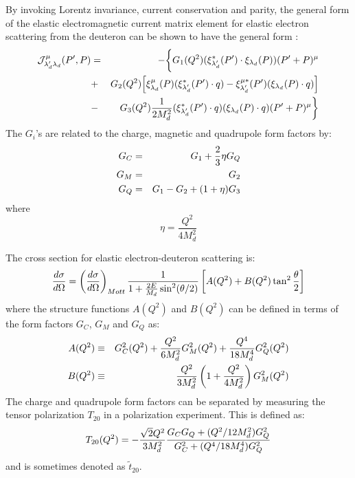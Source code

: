 \documentclass[mythesis.tex]{subfiles}
\begin{document}
By invoking Lorentz invariance, current conservation and parity, the
general form of the elastic electromagnetic current matrix element for
elastic electron scattering from the deuteron can be shown to have the
general form \cite{ACG}:
%
\begin{eqnarray}
{\cal J}^\mu_{\lambda_d' \lambda_d} (P',P) & = & - \biggl \{ G_1 (Q^2)
(\xi^*_{\lambda_d'}(P') \cdot \xi_{\lambda_d}(P) )
(P' + P)^\mu \nonumber \\
& + & G_2 (Q^2) \Bigl [ \xi^\mu_{\lambda_d}(P)
(\xi^*_{\lambda_d'}(P') \cdot q ) -
\xi^{\mu *}_{\lambda_d'}(P') (\xi_{\lambda_d}(P) \cdot q)
\Bigr ] \nonumber \\
& - & G_3 (Q^2) {1 \over 2 M_d^2} (\xi^*_{\lambda_d'}(P')
\cdot q ) ( \xi_{\lambda_d}(P) \cdot q) (P' + P) ^\mu
\biggr \}
\end{eqnarray}
%
The $G_i$'s are related to the charge, magnetic and quadrupole form factors
by:
%
\begin{eqnarray}
G_C & = & G_1 + {2 \over 3} \eta G_Q \nonumber\\
G_M & = & G_2  \nonumber\\
G_Q & = & G_1 - G_2 + (1 + \eta) G_3
\end{eqnarray}
%
where
%
\begin{equation}
\eta=\frac{Q^2}{4 M_d^2}
\end{equation}

The cross section for elastic electron-deuteron scattering is:
\begin{equation}
{d \sigma \over d \Omega} = \left( {d \sigma \over d \Omega}
\right)_{Mott}\frac{1}{ 1 + \frac{2 E }{ M_d} \sin^2
(\theta / 2)  } \left [ A (Q^2) + B (Q^2) \tan^2 {\theta \over 2}
\right ]
\end{equation}
%
where the structure functions $A(Q^2)$ and $B(Q^2)$ can be defined in terms
of the form factors $G_C$, $G_M$ and $G_Q$ as:
%
\begin{eqnarray}
A (Q^2) & \equiv & G_C^2 (Q^2) + {Q^2 \over 6 M_d^2} G_M^2 (Q^2)
+ {Q^4 \over 18 M_d^4} G_Q^2 (Q^2) \nonumber\\
B (Q^2) & \equiv & {Q^2 \over 3 M_d^2} \left ( 1 +
{Q^2 \over 4 M_d^2} \right ) G_M^2 (Q^2) \nonumber
\end{eqnarray}
%
The charge and quadrupole form factors can be separated by measuring
the tensor polarization $T_{20}$ in a polarization experiment.
This is defined as:
%
\begin{equation}
T_{20} (Q^2) = -{\sqrt 2 Q^2 \over 3 M_d^2} {G_C G_Q + (Q^2 / 12 M_d^2)
G_Q^2 \over G_C^2 + (Q^4 / 18 M_d^4) G_Q^2}
\end{equation}
and is sometimes denoted as $\tilde t_{20}$.
\end{document}
